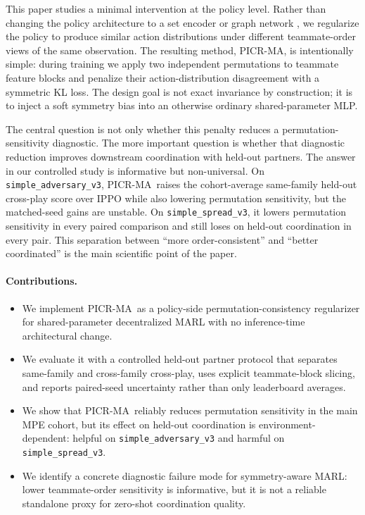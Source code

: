 \documentclass{article}
\newcommand{\method}{PICR-MA}
\begin{document}
This paper studies a minimal intervention at the policy level. Rather than changing the policy architecture to a set encoder or graph network \citep{zaheer2017deepsets, liu2020pic}, we regularize the policy to produce similar action distributions under different teammate-order views of the same observation. The resulting method, \method, is intentionally simple: during training we apply two independent permutations to teammate feature blocks and penalize their action-distribution disagreement with a symmetric KL loss. The design goal is not exact invariance by construction; it is to inject a soft symmetry bias into an otherwise ordinary shared-parameter MLP.

The central question is not only whether this penalty reduces a permutation-sensitivity diagnostic. The more important question is whether that diagnostic reduction improves downstream coordination with held-out partners. The answer in our controlled study is informative but non-universal. On \texttt{simple\_adversary\_v3}, \method\ raises the cohort-average same-family held-out cross-play score over IPPO while also lowering permutation sensitivity, but the matched-seed gains are unstable. On \texttt{simple\_spread\_v3}, it lowers permutation sensitivity in every paired comparison and still loses on held-out coordination in every pair. This separation between ``more order-consistent'' and ``better coordinated'' is the main scientific point of the paper.

\paragraph{Contributions.}
\begin{itemize}[leftmargin=1.3em]
\item We implement \method\ as a policy-side permutation-consistency regularizer for shared-parameter decentralized MARL with no inference-time architectural change.
\item We evaluate it with a controlled held-out partner protocol that separates same-family and cross-family cross-play, uses explicit teammate-block slicing, and reports paired-seed uncertainty rather than only leaderboard averages.
\item We show that \method\ reliably reduces permutation sensitivity in the main MPE cohort, but its effect on held-out coordination is environment-dependent: helpful on \texttt{simple\_adversary\_v3} and harmful on \texttt{simple\_spread\_v3}.
\item We identify a concrete diagnostic failure mode for symmetry-aware MARL: lower teammate-order sensitivity is informative, but it is not a reliable standalone proxy for zero-shot coordination quality.
\end{itemize}
\end{document}

